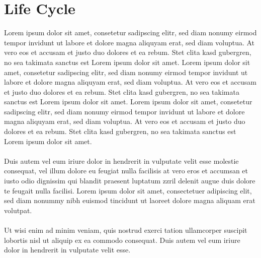\section{Life Cycle}
Lorem ipsum dolor sit amet, consetetur sadipscing elitr, sed diam nonumy eirmod tempor invidunt ut labore et dolore magna aliquyam erat, sed diam voluptua. At vero eos et accusam et justo duo dolores et ea rebum. Stet clita kasd gubergren, no sea takimata sanctus est Lorem ipsum dolor sit amet. Lorem ipsum dolor sit amet, consetetur sadipscing elitr, sed diam nonumy eirmod tempor invidunt ut labore et dolore magna aliquyam erat, sed diam voluptua. At vero eos et accusam et justo duo dolores et ea rebum. Stet clita kasd gubergren, no sea takimata sanctus est Lorem ipsum dolor sit amet. Lorem ipsum dolor sit amet, consetetur sadipscing elitr, sed diam nonumy eirmod tempor invidunt ut labore et dolore magna aliquyam erat, sed diam voluptua. At vero eos et accusam et justo duo dolores et ea rebum. Stet clita kasd gubergren, no sea takimata sanctus est Lorem ipsum dolor sit amet.  \\\\Duis autem vel eum iriure dolor in hendrerit in vulputate velit esse molestie consequat, vel illum dolore eu feugiat nulla facilisis at vero eros et accumsan et iusto odio dignissim qui blandit praesent luptatum zzril delenit augue duis dolore te feugait nulla facilisi. Lorem ipsum dolor sit amet, consectetuer adipiscing elit, sed diam nonummy nibh euismod tincidunt ut laoreet dolore magna aliquam erat volutpat.\\\\Ut wisi enim ad minim veniam, quis nostrud exerci tation ullamcorper suscipit lobortis nisl ut aliquip ex ea commodo consequat. Duis autem vel eum iriure dolor in hendrerit in vulputate velit esse.